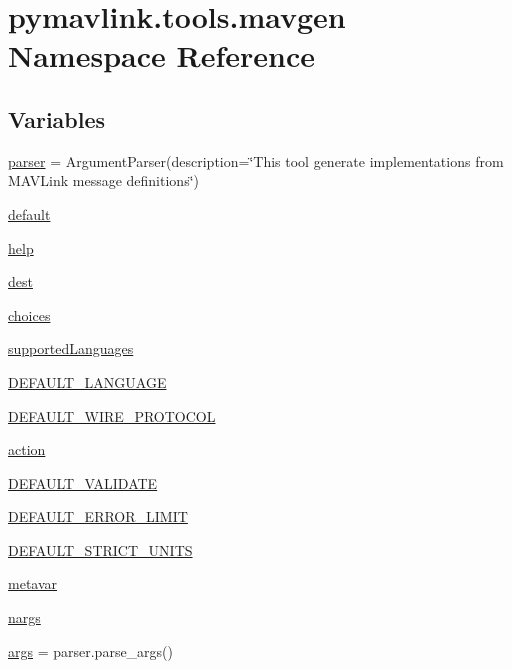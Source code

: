 \hypertarget{namespacepymavlink_1_1tools_1_1mavgen}{}\section{pymavlink.\+tools.\+mavgen Namespace Reference}
\label{namespacepymavlink_1_1tools_1_1mavgen}
\subsection*{Variables}
\begin{DoxyCompactItemize}
\item 
\mbox{\hyperlink{namespacepymavlink_1_1tools_1_1mavgen_a75961cc4774b7274c1b2beb747c502b5}{parser}} = Argument\+Parser(description=\char`\"{}This tool generate implementations from M\+A\+V\+Link message definitions\char`\"{})
\item 
\mbox{\hyperlink{namespacepymavlink_1_1tools_1_1mavgen_ad13d167b072a2ad2faad668003687a68}{default}}
\item 
\mbox{\hyperlink{namespacepymavlink_1_1tools_1_1mavgen_ab477f632a1433496e463a44bd4ec02bb}{help}}
\item 
\mbox{\hyperlink{namespacepymavlink_1_1tools_1_1mavgen_a8b7a98f1656584e9893cfc3ba18e6d65}{dest}}
\item 
\mbox{\hyperlink{namespacepymavlink_1_1tools_1_1mavgen_a4b803f2f45afaf55c54a2a6ce4d207e4}{choices}}
\item 
\mbox{\hyperlink{namespacepymavlink_1_1tools_1_1mavgen_a59e9627cc807847e3c72205eecc64d22}{supported\+Languages}}
\item 
\mbox{\hyperlink{namespacepymavlink_1_1tools_1_1mavgen_aedc782c7b233b48a826b4c172e13d6cc}{D\+E\+F\+A\+U\+L\+T\+\_\+\+L\+A\+N\+G\+U\+A\+GE}}
\item 
\mbox{\hyperlink{namespacepymavlink_1_1tools_1_1mavgen_a9f4a817c91ec87a398a22689d2325070}{D\+E\+F\+A\+U\+L\+T\+\_\+\+W\+I\+R\+E\+\_\+\+P\+R\+O\+T\+O\+C\+OL}}
\item 
\mbox{\hyperlink{namespacepymavlink_1_1tools_1_1mavgen_ad1a13c732d7b5b8ed0b947b8676ab432}{action}}
\item 
\mbox{\hyperlink{namespacepymavlink_1_1tools_1_1mavgen_a7891afd39197c66f59dea5530e280212}{D\+E\+F\+A\+U\+L\+T\+\_\+\+V\+A\+L\+I\+D\+A\+TE}}
\item 
\mbox{\hyperlink{namespacepymavlink_1_1tools_1_1mavgen_a0a8ea614bdce04c99b1f5484cb3dba54}{D\+E\+F\+A\+U\+L\+T\+\_\+\+E\+R\+R\+O\+R\+\_\+\+L\+I\+M\+IT}}
\item 
\mbox{\hyperlink{namespacepymavlink_1_1tools_1_1mavgen_acc2caa3cdab7ecccbaa404001d7401b3}{D\+E\+F\+A\+U\+L\+T\+\_\+\+S\+T\+R\+I\+C\+T\+\_\+\+U\+N\+I\+TS}}
\item 
\mbox{\hyperlink{namespacepymavlink_1_1tools_1_1mavgen_a907e2e63bff773d6e4b6ab4db00af057}{metavar}}
\item 
\mbox{\hyperlink{namespacepymavlink_1_1tools_1_1mavgen_a3689a5bff8d0728f32f03b892691f98e}{nargs}}
\item 
\mbox{\hyperlink{namespacepymavlink_1_1tools_1_1mavgen_a888343496d6a4a5f4101ab9385211105}{args}} = parser.\+parse\+\_\+args()
\end{DoxyCompactItemize}



